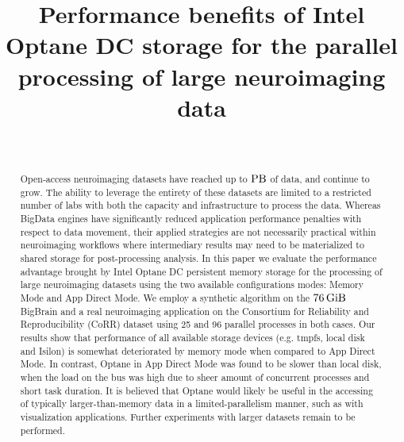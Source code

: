 \documentclass[conference]{IEEEtran}
\newcommand{\bigbrain}{BigBrain }
\begin{document}
\title{Performance benefits of Intel Optane DC storage for the parallel processing of large neuroimaging data}

\author{\\
}
\maketitle

\begin{abstract}
    Open-access neuroimaging datasets have reached up to $\SI{}{\peta\byte}$ of data, and
    continue to grow. The ability to leverage the entirety of these datasets are
    limited to a restricted number of labs with both the capacity and infrastructure
    to process the data. Whereas BigData engines have significantly reduced
    application performance penalties with respect to data movement, their applied
    strategies are not necessarily practical within neuroimaging workflows where
    intermediary results may need to be materialized to shared storage for post-processing
    analysis. In this paper we evaluate the performance advantage brought by Intel
    Optane DC persistent memory storage for the processing of large neuroimaging 
    datasets using the two available configurations modes: Memory Mode and App Direct Mode.
    We employ a synthetic algorithm on the $\SI{76}{\gibi\byte}$ \bigbrain
    and a real neuroimaging application on the Consortium for Reliability and Reproducibility (CoRR)
    dataset using 25 and 96 parallel
    processes in both cases. Our results show that performance of all available storage
    devices (e.g. tmpfs, local disk and Isilon) is somewhat deteriorated by memory mode
    when compared to App Direct Mode. In contrast, Optane in App Direct Mode was
    found to be slower than local disk, when the load on the bus was high due to sheer
    amount of concurrent processes and short task duration. It is believed that
    Optane would likely be useful in the accessing of typically larger-than-memory
    data in a limited-parallelism manner, such as with visualization applications.
    Further experiments with larger datasets remain to be performed.

\end{abstract}
\end{document}
